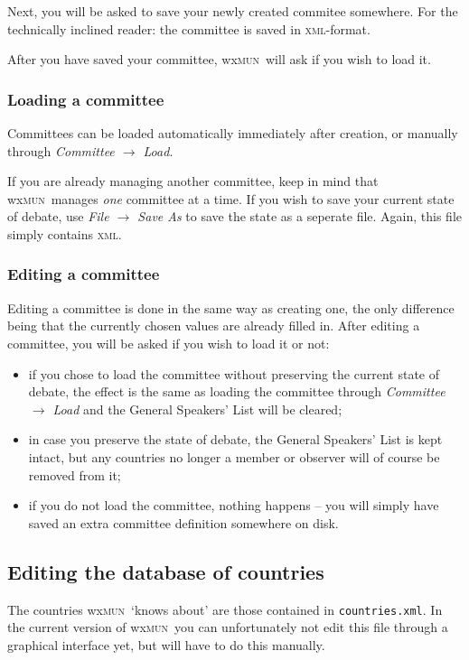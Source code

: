 \documentclass[11pt, a4paper]{article}
\newcommand\wxMUN{wx\textsc{mun}}
\begin{document}
Next, you will be asked to save your newly created commitee somewhere. For the technically inclined reader: the committee is saved in \textsc{xml}-format.

After you have saved your committee, \wxMUN\ will ask if you wish to load it. 

\subsubsection{Loading a committee}
Committees can be loaded automatically immediately after creation, or manually through \emph{Committee $\rightarrow$ Load}.

If you are already managing another committee, keep in mind that \wxMUN\ manages \emph{one} committee at a time. If you wish to save your current state of debate, use \emph{File $\rightarrow$ Save As} to save the state as a seperate file. Again, this file simply contains \textsc{xml}.

\subsubsection{Editing a committee}
Editing a committee is done in the same way as creating one, the only difference being that the currently chosen values are already filled in. After editing a committee, you will be asked if you wish to load it or not:

\begin{itemize}
\item if you chose to load the committee without preserving the current state of debate, the effect is the same as loading the committee through \emph{Committee $\rightarrow$ Load} and the General Speakers' List will be cleared; 

\item in case you preserve the state of debate, the General Speakers' List is kept intact, but any countries no longer a member or observer will of course be removed from it;

\item if you do not load the committee, nothing happens -- you will simply have saved an extra committee definition somewhere on disk.
\end{itemize}

\subsection{Editing the database of countries}
The countries \wxMUN\ `knows about' are those contained in \texttt{countries.xml}. In the current version of \wxMUN\ you can unfortunately not edit this file through a graphical interface yet, but will have to do this manually.
\end{document}
